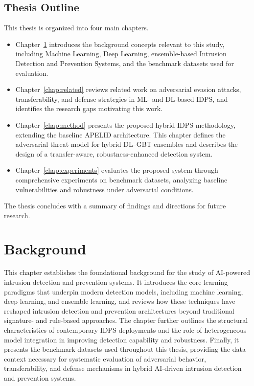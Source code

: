 \documentclass[12pt, a4paper, reqno, oneside]{book}
\newcommand \sect[1]{%
  \section*{#1}%
  \addcontentsline{toc}{section}{#1}}
\begin{document}
\newpage

\sect{Thesis Outline}

This thesis is organized into four main chapters.

\begin{itemize}
    \item Chapter~\ref{chap:intro} introduces the background concepts relevant to this study, including Machine Learning, Deep Learning, ensemble-based Intrusion Detection and Prevention Systems, and the benchmark datasets used for evaluation.
    
    \item Chapter~\ref{chap:related} reviews related work on adversarial evasion attacks, transferability, and defense strategies in ML- and DL-based IDPS, and identifies the research gaps motivating this work.
    
    \item Chapter~\ref{chap:method} presents the proposed hybrid IDPS methodology, extending the baseline APELID architecture. This chapter defines the adversarial threat model for hybrid DL--GBT ensembles and describes the design of a transfer-aware, robustness-enhanced detection system.
    
    \item Chapter~\ref{chap:experiments} evaluates the proposed system through comprehensive experiments on benchmark datasets, analyzing baseline vulnerabilities and robustness under adversarial conditions.
\end{itemize}

The thesis concludes with a summary of findings and directions for future research.




\chapter{Background}
\label{chap:intro}
This chapter establishes the foundational background for the study of AI-powered intrusion detection and prevention systems. It introduces the core learning paradigms that underpin modern detection models, including machine learning, deep learning, and ensemble learning, and reviews how these techniques have reshaped intrusion detection and prevention architectures beyond traditional signature- and rule-based approaches. The chapter further outlines the structural characteristics of contemporary IDPS deployments and the role of heterogeneous model integration in improving detection capability and robustness. Finally, it presents the benchmark datasets used throughout this thesis, providing the data context necessary for systematic evaluation of adversarial behavior, transferability, and defense mechanisms in hybrid AI-driven intrusion detection and prevention systems.
\end{document}
